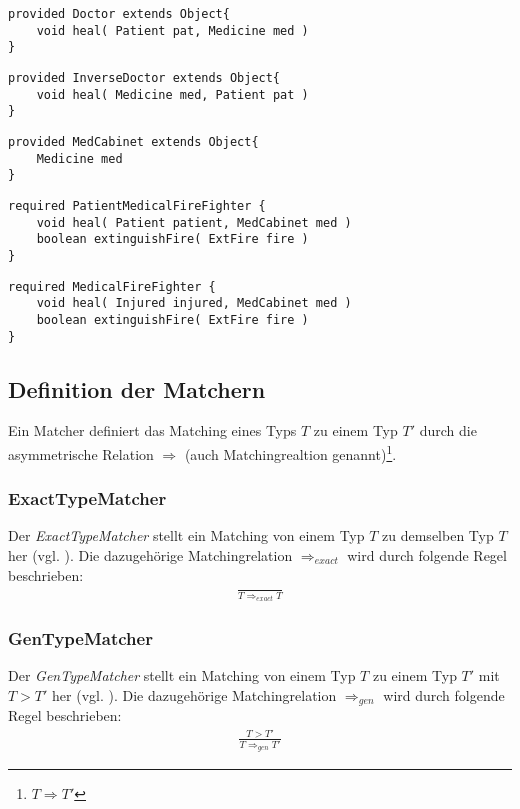 \begin{lstlisting}[style = dsl]
provided Doctor extends Object{	
	void heal( Patient pat, Medicine med )
}
\end{lstlisting}


\begin{lstlisting}[style = dsl]
provided InverseDoctor extends Object{	
	void heal( Medicine med, Patient pat )
}
\end{lstlisting}

\begin{lstlisting}[style = dsl]
provided MedCabinet extends Object{
	Medicine med
}
\end{lstlisting}

\begin{lstlisting}[style = dsl]
required PatientMedicalFireFighter {
	void heal( Patient patient, MedCabinet med )
	boolean extinguishFire( ExtFire fire )	
}
\end{lstlisting}

\begin{lstlisting}[caption={Bibliothek \emph{ExampLe} von Typen},captionpos=b, style = dsl, label=lst:libEx]
required MedicalFireFighter {
	void heal( Injured injured, MedCabinet med )
	boolean extinguishFire( ExtFire fire )	
}
\end{lstlisting}
\noindent
\subsection{Definition der Matchern}\label{sec_matcher}
Ein Matcher definiert das Matching eines Typs $T$ zu einem Typ $T'$ durch die asymmetrische Relation $\Rightarrow$ (auch Matchingrealtion genannt)\footnote{$T \Rightarrow T'$}.
\subsubsection{ExactTypeMatcher}\label{sec:exacttypematcher}
Der \emph{ExactTypeMatcher} stellt ein Matching von einem Typ $T$ zu demselben Typ $T$ her (vgl. \cite{moormann}). Die dazugehörige Matchingrelation $\Rightarrow_{exact}$ wird durch folgende Regel beschrieben:
\begin{gather*}
\frac{}{T \Rightarrow_{exact} T}
\end{gather*}
\subsubsection{GenTypeMatcher}\label{sec:gentypematcher}
Der \emph{GenTypeMatcher} stellt ein Matching von einem Typ $T$ zu einem Typ $T'$ mit $T > T'$ her (vgl. \cite{moormann}). Die dazugehörige Matchingrelation $\Rightarrow_{gen}$ wird durch folgende Regel beschrieben:
\begin{gather*}
\frac{T > T'}{T \Rightarrow_{gen} T'}
\end{gather*}
